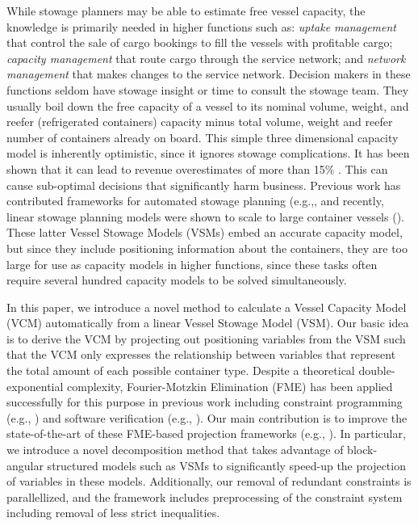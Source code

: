 \documentclass{llncs}
\begin{document}
While stowage planners may be able to estimate free vessel capacity, the knowledge is primarily needed in higher functions such as: {\em uptake management} that control the sale of cargo bookings to fill the vessels with profitable cargo; {\em capacity management} that route cargo through the service network; and {\em network management} that makes changes to the service network. Decision makers in these functions seldom have stowage insight or time to consult the stowage team. They usually boil down the free capacity of a vessel to its nominal volume, weight, and reefer (refrigerated containers) capacity minus total volume, weight and reefer number of containers already on board. This simple three dimensional capacity model is inherently optimistic, since it ignores stowage complications. It has been shown that it can lead to revenue overestimates of more than 15\% \cite{AlbertosThesis}. This can cause sub-optimal decisions that significantly harm business. Previous work has contributed frameworks for automated stowage planning (e.g.,\cite{roach00,kimkang02,ambrosino04,low09,delgado09,pacino12}, and recently, linear stowage planning models were shown to scale to large container vessels (\cite{pacino11,AlbertosThesis}). These latter Vessel Stowage Models (VSMs) embed an accurate capacity model, but since they include positioning information about the containers, they are too large for use as capacity models in higher functions, since these tasks often require several hundred capacity models to be solved simultaneously.

In this paper, we introduce a novel method to calculate a Vessel Capacity Model (VCM) automatically from a linear Vessel Stowage Model (VSM). Our basic idea is to derive the VCM by projecting out positioning variables from the VSM such that the VCM only expresses the relationship between variables that represent the total amount of each possible container type. Despite a theoretical double-exponential complexity, Fourier-Motzkin Elimination (FME) has been applied successfully for this purpose in previous work including constraint programming (e.g., \cite{lassez90}) and software verification (e.g., \cite{benoy05}). Our main contribution is to improve the state-of-the-art of these FME-based projection frameworks (e.g., \cite{simon05,lukatskii08,shapot12}). In particular, we introduce a novel decomposition method that takes advantage of block-angular structured models such as VSMs to significantly speed-up the projection of variables in these models. Additionally, our removal of redundant constraints is parallellized, and the framework includes preprocessing of the constraint system including removal of less strict inequalities.
\end{document}

